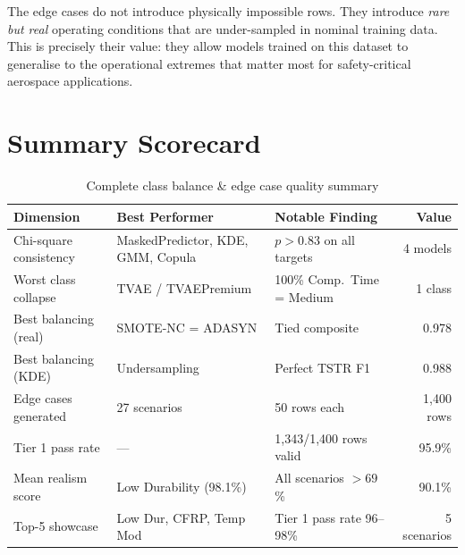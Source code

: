 \documentclass[12pt,a4paper]{article}
\begin{document}
\begin{tcolorbox}[successbox, title={Written Justification for Edge Case Physical Realism}]
\medskip
The edge cases do not introduce physically impossible rows. They introduce \emph{rare but real} operating conditions that are under-sampled in nominal training data. This is precisely their value: they allow models trained on this dataset to generalise to the operational extremes that matter most for safety-critical aerospace applications.
\end{tcolorbox}

\section{Summary Scorecard}

\begin{table}[H]
\centering
\caption{Complete class balance \& edge case quality summary}
\label{tab:scorecard}
\renewcommand{\arraystretch}{1.3}
\begin{tabular}{lp{4.5cm}p{3.5cm}r}
\toprule
\textbf{Dimension} & \textbf{Best Performer} & \textbf{Notable Finding} & \textbf{Value} \\
\midrule
Chi-square consistency & MaskedPredictor, KDE, GMM, Copula & $p > 0.83$ on all targets & 4 models \\
Worst class collapse & TVAE / TVAEPremium & 100\% Comp.\ Time = Medium & 1 class \\
Best balancing (real) & SMOTE-NC = ADASYN & Tied composite & 0.978 \\
Best balancing (KDE) & Undersampling & Perfect TSTR F1 & 0.988 \\
Edge cases generated & 27 scenarios & 50 rows each & 1,400 rows \\
Tier 1 pass rate & --- & 1,343/1,400 rows valid & 95.9\% \\
Mean realism score & Low Durability (98.1\%) & All scenarios $> 69$\% & 90.1\% \\
Top-5 showcase & Low Dur, CFRP, Temp Mod & Tier 1 pass rate 96--98\% & 5 scenarios \\
\bottomrule
\end{tabular}
\end{table}
\end{document}
